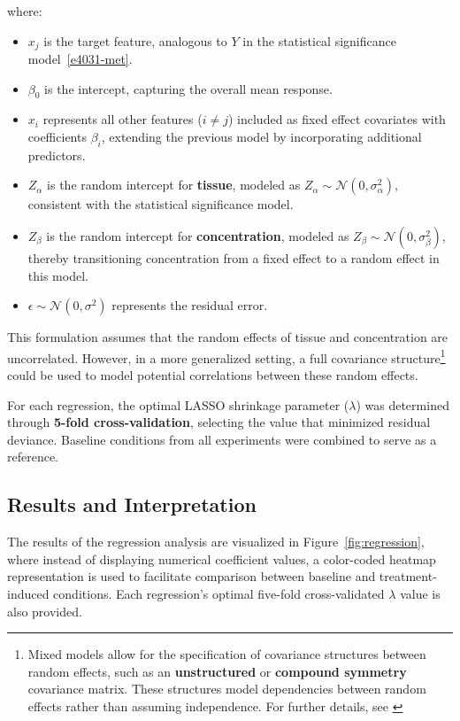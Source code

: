 \documentclass{report}
\begin{document}
        where:
        \begin{itemize}
            \item \( x_j \) is the target feature, analogous to \( Y \) in the statistical significance model~\ref{e4031-met}.
            \item \( \beta_0 \) is the intercept, capturing the overall mean response.
            \item \( x_i \) represents all other features (\( i \neq j \)) included as fixed effect covariates with coefficients $\beta_i$, extending the previous model by incorporating additional predictors.
            \item \( Z_\alpha \) is the random intercept for \textbf{tissue}, modeled as \( Z_\alpha \sim \mathcal{N}(0, \sigma_\alpha^2) \), consistent with the statistical significance model.
            \item \( Z_\beta \) is the random intercept for \textbf{concentration}, modeled as \( Z_\beta \sim \mathcal{N}(0, \sigma_\beta^2) \), thereby transitioning concentration from a fixed effect to a random effect in this model.
            \item \( \epsilon \sim \mathcal{N}(0, \sigma^2) \) represents the residual error.
        \end{itemize}
        This formulation assumes that the random effects of tissue and concentration are uncorrelated. However, in a more generalized setting, a full covariance structure\footnote{Mixed models allow for the specification of covariance structures between random effects, such as an \textbf{unstructured} or \textbf{compound symmetry} covariance matrix. These structures model dependencies between random effects rather than assuming independence. For further details, see \cite{PinheiroBates2000}} could be used to model potential correlations between these random effects.
        
    For each regression, the optimal LASSO shrinkage parameter (\( \lambda \)) was determined through \textbf{5-fold cross-validation}, selecting the value that minimized residual deviance. Baseline conditions from all experiments were combined to serve as a reference.
    
    \subsection{Results and Interpretation}
    
    The results of the regression analysis are visualized in Figure~\ref{fig:regression}, where instead of displaying numerical coefficient values, a color-coded heatmap representation is used to facilitate comparison between baseline and treatment-induced conditions. Each regression’s optimal five-fold cross-validated \( \lambda \) value is also provided.
    
\end{document}
